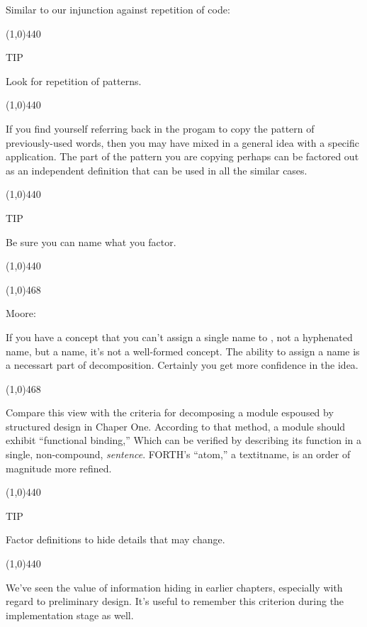 \documentclass{book}
\begin{document}
Similar to our injunction against repetition of code:

\line(1,0){440}

TIP

Look for repetition of patterns.

\line(1,0){440}

\bigskip

\noindent
If you find yourself referring back in the progam to copy the pattern of previously-used words, then you may have mixed in a general idea with a specific application. The part of the pattern you are copying perhaps can be factored out as an independent definition that can be used in all the similar cases.

\line(1,0){440}

TIP

Be sure you can name what you factor.

\line(1,0){440}

\noindent
\line(1,0){468} 

\noindent
Moore:

\begin{list}{}{}

\item
If you have a concept that you can't assign a single name to , not a hyphenated name, but a name, it's not a well-formed concept. The ability to assign a name is a necessart part of decomposition. Certainly you get more confidence in the idea.

\end{list}{}{}

\noindent
\line(1,0){468}

\bigskip

\noindent
Compare this view with the criteria for decomposing a module espoused by structured design in Chaper One. According to that method, a module should exhibit ``functional binding,'' Which can be verified by describing its function in a single, non-compound, \textit{sentence}. FORTH's ``atom,'' a textit{name}, is an order of magnitude more refined.

\line(1,0){440}

TIP

Factor definitions to hide details that may change.

\line(1,0){440}

\bigskip

\noindent
We've seen the value of information hiding in earlier chapters, especially with regard to preliminary design. It's useful to remember this criterion during the implementation stage as well.
\end{document}
